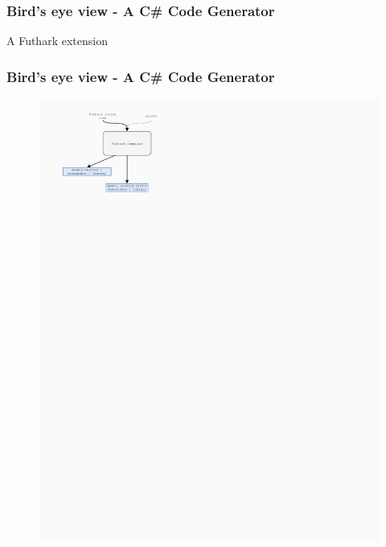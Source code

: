 \documentclass[10pt, compress, usenames, dvipsnames]{beamer}
\begin{document}
\begin{frame}[plain,c]
\frametitle{Bird's eye view - A C\# Code Generator}
\begin{center}
  \Huge A Futhark extension
\end{center}
\end{frame}

\begin{frame}[fragile]
  \frametitle{Bird's eye view - A C\# Code Generator}
    \begin{figure}
      \begin{overprint}
        \includegraphics{./images/futhark_diagram_before.pdf}

\end{overprint}
\end{figure}
\end{frame}
\end{document}
